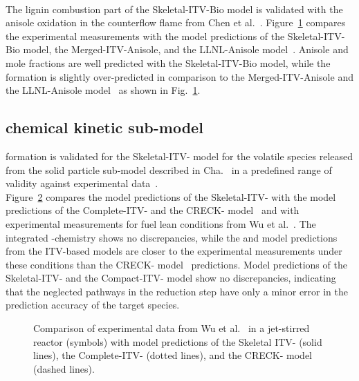 \begin{refsection}
\begin{figure}[b]
  \label{fig:B1bAnisoleOxidationBioMechanismOXY}
\end{figure}
\\
The lignin combustion part of the Skeletal-ITV-Bio model is validated with the anisole oxidation in the  counterflow flame from Chen et al.~\cite{Chen2022}. Figure~\ref{fig:B1bAnisoleOxidationBioMechanismOXY} compares the experimental measurements with the model predictions of the Skeletal-ITV-Bio model, the Merged-ITV-Anisole, and the LLNL-Anisole model~\cite{Wagnon2018}. Anisole and  mole fractions are well predicted with the Skeletal-ITV-Bio model, while the  formation is slightly over-predicted in comparison to the Merged-ITV-Anisole and the LLNL-Anisole model~\cite{Wagnon2018} as shown in Fig.~\ref{fig:B1bAnisoleOxidationBioMechanismOXY}.


\subsection{ chemical kinetic sub-model}
 formation is validated for the Skeletal-ITV- model for the volatile species released from the solid particle sub-model described in Cha.~ in a predefined range of validity against experimental data~\cite{Wu2022}.
\\
Figure~\ref{fig:B1bNOxWuValidation} compares the model predictions of the Skeletal-ITV- with the model predictions of the Complete-ITV- and the CRECK- model~\cite{Shamooni2021} and with experimental measurements for fuel lean conditions from Wu et al.~\cite{ Wu2022}. The integrated -chemistry shows no discrepancies, while the  and  model predictions from the ITV-based models are closer to the experimental measurements under these conditions than the CRECK- model~\cite{Shamooni2021} predictions. Model predictions of the Skeletal-ITV- and the Compact-ITV- model show no discrepancies, indicating that the neglected pathways in the reduction step have only a minor error in the prediction accuracy of the target species.
\begin{figure}[h]
  \centering
  \hfill
  \hfill
  \caption{Comparison of experimental data from Wu et al.~\cite{Wu2022} in a jet-stirred reactor (symbols) with model predictions of the Skeletal ITV- (solid lines), the Complete-ITV- (dotted lines), and the CRECK- model~\cite{Shamooni2021} (dashed lines).}
  \label{fig:B1bNOxWuValidation}
\end{figure}




\Acknowledgement

\renewcommand{\bibname}{References}
\printbibliography[heading=subbibliography]

\end{refsection}
